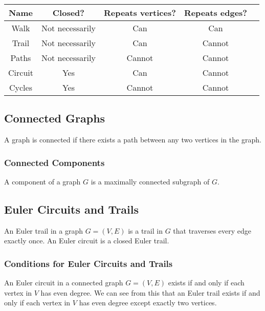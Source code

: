 \begin{center}
    \begin{tabular} {| c | c | c | c | c |}
        \hline
        Name & Closed? & Repeats vertices? & Repeats edges? \\
        \hline \hline
        Walk        & Not necessarily & Can    & Can    \\ \hline
        Trail       & Not necessarily & Can    & Cannot \\ \hline
        Paths       & Not necessarily & Cannot & Cannot \\ \hline
        Circuit     & Yes             & Can    & Cannot \\ \hline
        Cycles      & Yes             & Cannot & Cannot \\ \hline
    \end{tabular}
\end{center}

\subsection{Connected Graphs}

A graph is connected if there exists a path between any two vertices 
in the graph.

\subsubsection{Connected Components}

A component of a graph $G$ is a maximally connected subgraph of $G$.

\subsection{Euler Circuits and Trails}

An Euler trail in a graph $G = (V, E)$ is a trail in $G$ that traverses every edge
exactly once. An Euler circuit is a closed Euler trail.

\subsubsection{Conditions for Euler Circuits and Trails}

An Euler circuit in a connected graph $G = (V, E)$ exists if and only 
if each vertex in $V$ has even degree. We can see from this that
an Euler trail exists if and only if each vertex in $V$ has even
degree except exactly two vertices.

